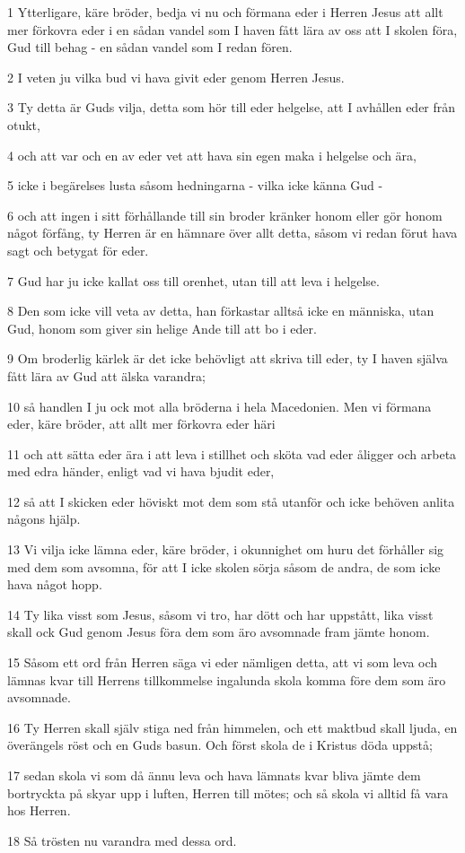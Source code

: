 \par 1 Ytterligare, käre bröder, bedja vi nu och förmana eder i Herren Jesus att allt mer förkovra eder i en sådan vandel som I haven fått lära av oss att I skolen föra, Gud till behag - en sådan vandel som I redan fören.
\par 2 I veten ju vilka bud vi hava givit eder genom Herren Jesus.
\par 3 Ty detta är Guds vilja, detta som hör till eder helgelse, att I avhållen eder från otukt,
\par 4 och att var och en av eder vet att hava sin egen maka i helgelse och ära,
\par 5 icke i begärelses lusta såsom hedningarna - vilka icke känna Gud -
\par 6 och att ingen i sitt förhållande till sin broder kränker honom eller gör honom något förfång, ty Herren är en hämnare över allt detta, såsom vi redan förut hava sagt och betygat för eder.
\par 7 Gud har ju icke kallat oss till orenhet, utan till att leva i helgelse.
\par 8 Den som icke vill veta av detta, han förkastar alltså icke en människa, utan Gud, honom som giver sin helige Ande till att bo i eder.
\par 9 Om broderlig kärlek är det icke behövligt att skriva till eder, ty I haven själva fått lära av Gud att älska varandra;
\par 10 så handlen I ju ock mot alla bröderna i hela Macedonien. Men vi förmana eder, käre bröder, att allt mer förkovra eder häri
\par 11 och att sätta eder ära i att leva i stillhet och sköta vad eder åligger och arbeta med edra händer, enligt vad vi hava bjudit eder,
\par 12 så att I skicken eder höviskt mot dem som stå utanför och icke behöven anlita någons hjälp.
\par 13 Vi vilja icke lämna eder, käre bröder, i okunnighet om huru det förhåller sig med dem som avsomna, för att I icke skolen sörja såsom de andra, de som icke hava något hopp.
\par 14 Ty lika visst som Jesus, såsom vi tro, har dött och har uppstått, lika visst skall ock Gud genom Jesus föra dem som äro avsomnade fram jämte honom.
\par 15 Såsom ett ord från Herren säga vi eder nämligen detta, att vi som leva och lämnas kvar till Herrens tillkommelse ingalunda skola komma före dem som äro avsomnade.
\par 16 Ty Herren skall själv stiga ned från himmelen, och ett maktbud skall ljuda, en överängels röst och en Guds basun. Och först skola de i Kristus döda uppstå;
\par 17 sedan skola vi som då ännu leva och hava lämnats kvar bliva jämte dem bortryckta på skyar upp i luften, Herren till mötes; och så skola vi alltid få vara hos Herren.
\par 18 Så trösten nu varandra med dessa ord.

